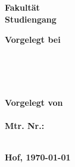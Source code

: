 \begin{titlepage} %
	
	\center %
	
	
	\textbf{\Large \mytitle}\\[0.5cm]
	\textbf{\large \mysubtitle}\\[0.5cm]

  \vspace{3cm}

  \textbf{\Large \textls{\mydoctype}}\\[0.8cm]
	
  \textbf{\myuniname{}\\
  Fakultät \myfaculty{}\\
  Studiengang \mycourse{}}\\[0.5cm]
	
  \vfill\vfill\vfill

	\begin{minipage}{0.4\textwidth}
		\begin{flushleft}
			\textbf{Vorgelegt bei\\
      \mydocent{}\\
      \myunistreet{} \myuninumber{}\\
      \myunizip{} \myuniplace{}
      }
		\end{flushleft}
	\end{minipage}
	~
	\begin{minipage}{0.4\textwidth}
		\begin{flushright}
			\textbf{
      Vorgelegt von\\
      \myname{}\\
      Mtr. Nr.: \mymatrnr{}\\
      \mystreet{} \mynumber{}\\
      \myzip{} \myplace{}
      }
		\end{flushright}
	\end{minipage}
	
  \vfill

	
	\textbf{Hof, \today} %
	
	
\end{titlepage}
\restoregeometry
